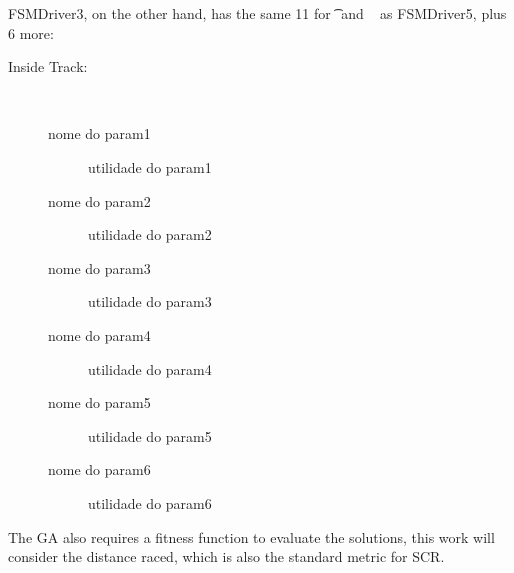 FSMDriver3, on the other hand, has the same 11 for \t~and \St~ as FSMDriver5, plus 6 more:

\begin{description}
	\item[Inside Track:] \ %
	\begin{description}
		\item[nome do param1] utilidade do param1
		\item[nome do param2] utilidade do param2
		\item[nome do param3] utilidade do param3
		\item[nome do param4] utilidade do param4
		\item[nome do param5] utilidade do param5
		\item[nome do param6] utilidade do param6
	\end{description}
\end{description}

The GA also requires a fitness function to evaluate the solutions, this work will consider the distance raced, which is also the standard metric for SCR.


